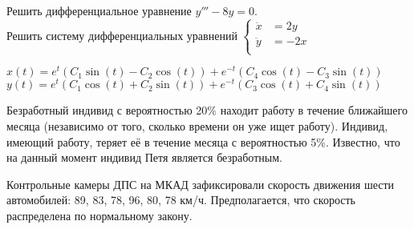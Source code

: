 \documentclass[addpoints, answers]{exam} %
\begin{document}
\begin{questions}
\question Решить дифференциальное уравнение $y'''-8y=0$.\\

\question Решить систему дифференциальных уравнений
$\left\{ \begin{aligned}
\ddot{x}&=2y\\
\ddot{y}&=-2x\\
\end{aligned} \right.$\\

\begin{solution}
 $x(t)=e^{t}(C_{1}\sin(t)-C_{2}\cos(t))+e^{-t}(C_{4}\cos(t)-C_{3}\sin(t))$\\
$y(t)=e^{t}(C_{1}\cos(t)+C_{2}\sin(t))+e^{-t}(C_{3}\cos(t)+C_{4}\sin(t))$
\end{solution}

\question Безработный индивид с вероятностью 20\% находит работу в течение ближайшего месяца (независимо от того, сколько времени он уже ищет работу). Индивид, имеющий работу, теряет её в течение месяца с вероятностью 5\%. Известно, что на данный момент индивид Петя является безработным.
\question Контрольные камеры ДПС на МКАД зафиксировали скорость движения шести автомобилей: 89, 83, 78, 96, 80, 78 км/ч. Предполагается, что скорость распределена по нормальному закону.
\end{questions}
\end{document}
